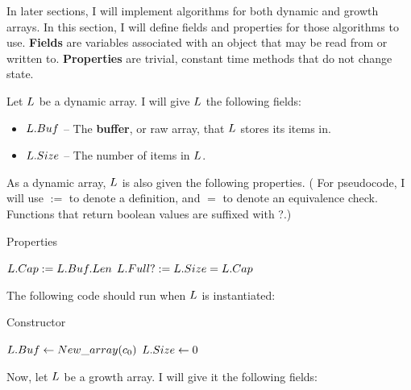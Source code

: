 In later sections, I will implement algorithms for both dynamic and growth arrays. In this section, I will define fields and properties for those algorithms to use. \textbf{Fields} are variables associated with an object that may be read from or written to. \textbf{Properties} are trivial, constant time methods that do not change state.

Let $\VarList$ be a dynamic array. I will give $\VarList$ the following fields:

\begin{itemize}
	\item $L.Buf$ -- The \textbf{buffer}, or raw array, that $\VarList$ stores its items in.
	\item $L.Size$ -- The number of items in $\VarList$.
\end{itemize}

As a dynamic array, $\VarList$ is also given the following properties. ({\HdrNote} For pseudocode, I will use $:=$ to denote a definition, and $=$ to denote an equivalence check. Functions that return boolean values are suffixed with ?.)

\begin{algorithm}[H]
	\caption{Properties \TextDynamicArray}
	\begin{algorithmic}
		\State $L.Cap := L.Buf.Len$
		\State
		\State $L.Full? := L.Size = L.Cap$
	\end{algorithmic}
\end{algorithm}

The following code should run when $\VarList$ is instantiated:

\begin{algorithm}[H]
	\caption{Constructor \TextDynamicArray}
	\begin{algorithmic}
		\Procedure{$\FuncConstructor$}{$\VarList$}
			\State $L.Buf \gets New\_array(c_0)$
			\State $L.Size \gets 0$
		\EndProcedure
	\end{algorithmic}
\end{algorithm}

Now, let $\VarList$ be a growth array. I will give it the following fields:

